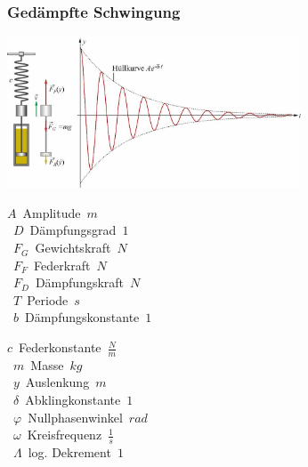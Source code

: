 \subsubsection{Gedämpfte Schwingung}
\begin{center}
	\begin{minipage}{0.2\textwidth}
	\end{minipage}%
	\begin{minipage}{0.3\textwidth}
		\includegraphics[height=4.5cm,keepaspectratio=true]{Images/gedaempfte_schwingung.png}
	\end{minipage}
\end{center}
\begin{center}
	\begin{minipage}{0.3\textwidth}
		\unit{$A$}{Amplitude}{$m$} \\
		\unit{$D$}{Dämpfungsgrad}{$1$} \\
		\unit{$F_G$}{Gewichtskraft}{$N$} \\
		\unit{$F_F$}{Federkraft}{$N$} \\
		\unit{$F_D$}{Dämpfungskraft}{$N$} \\
		\unit{$T$}{Periode}{$s$} \\
		\unit{$b$}{Dämpfungskonstante}{$1$}
	\end{minipage}%
	\begin{minipage}{0.3\textwidth}
		\unit{$c$}{Federkonstante}{$\frac{N}{m}$} \\
		\unit{$m$}{Masse}{$kg$} \\
		\unit{$y$}{Auslenkung}{$m$} \\
		\unit{$\delta$}{Abklingkonstante}{$1$} \\
		\unit{$\varphi$}{Nullphasenwinkel}{$rad$} \\
		\unit{$\omega$}{Kreisfrequenz}{$\frac{1}{s}$} \\
		\unit{$\varLambda$}{log. Dekrement}{$1$}
	\end{minipage}
\end{center}


